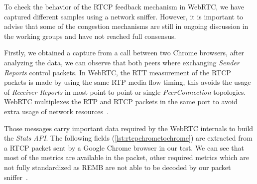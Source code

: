 

To check the behavior of the RTCP feedback mechanism in WebRTC, we have captured different samples using a network sniffer. However, it is important to advise that some of the congestion mechanisms are still in ongoing discussion in the working groups and have not reached full consensus.

Firstly, we obtained a capture from a call between two Chrome browsers, after analyzing the data, we can observe that both peers where exchanging {\it Sender Reports} control packets. In WebRTC, the RTT measurement of the RTCP packets is made by using the same RTP media flow timing, this avoids the usage of {\it Receiver Reports} in most point-to-point or single {\it PeerConnection} topologies. WebRTC multiplexes the RTP and RTCP packets in the same port to avoid extra usage of network resources~\cite{rtpusageIETF}.

Those messages carry important data required by the WebRTC internals to build the {\it Stats API}. The following fields (\ref{lst:rtcpchrometochrome}) are extracted from a RTCP packet sent by a Google Chrome browser in our test. We can see that most of the metrics are available in the packet, other required metrics which are not fully standardized as REMB are not able to be decoded by our packet sniffer~\cite{rtpusageIETF}.


